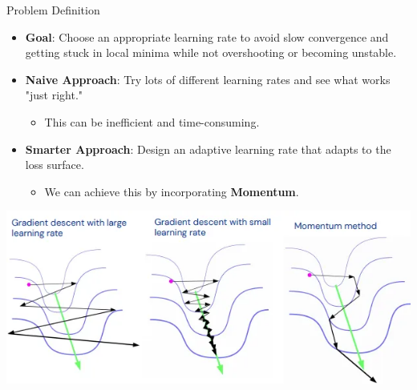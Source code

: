 \documentclass[serif, aspectratio=169]{beamer}
\begin{document}
\begin{frame}{Problem Definition}
    \begin{itemize}
        \item \textbf{Goal}: Choose an appropriate learning rate to avoid slow convergence and getting stuck in local minima while not overshooting or becoming unstable.
        \item \textbf{Naive Approach}: Try lots of different learning rates and see what works "just right."
        \begin{itemize}
            \item This can be inefficient and time-consuming.
        \end{itemize}
        \item \textbf{Smarter Approach}: Design an adaptive learning rate that adapts to the loss surface.
        \begin{itemize}
            \item We can achieve this by incorporating \textbf{Momentum}.
        \end{itemize}
    \end{itemize}
    \vfill
    \begin{center}
        \includegraphics[width=0.6\linewidth]{pic/compare_momentum.png}
    \end{center}
\end{frame}
\end{document}
